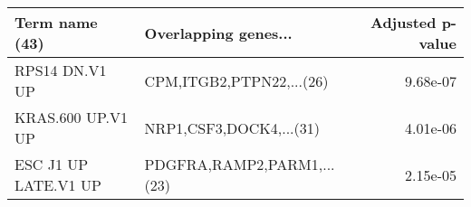 \begin{tabular}{llr}
\toprule
      Term name (43) &       Overlapping genes... &  Adjusted p-value \\
\midrule
      RPS14 DN.V1 UP &   CPM,ITGB2,PTPN22,...(26) &          9.68e-07 \\
   KRAS.600 UP.V1 UP &    NRP1,CSF3,DOCK4,...(31) &          4.01e-06 \\
ESC J1 UP LATE.V1 UP & PDGFRA,RAMP2,PARM1,...(23) &          2.15e-05 \\
\bottomrule
\end{tabular}
